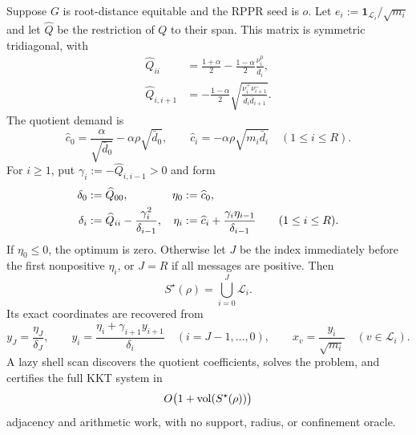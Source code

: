 \begin{theorem}
\label{thm:equitable-shell-one-pass}
Suppose $G$ is root-distance equitable and the RPPR seed is $o$.  Let
$e_i:=\mathbf 1_{\mathcal L_i}/\sqrt{m_i}$ and let $\widehat Q$ be the
restriction of $Q$ to their span.  This matrix is symmetric tridiagonal, with
\begin{align}
 \widehat Q_{ii}
 &=\frac{1+\alpha}{2}
   -\frac{1-\alpha}{2}\frac{\nu_i^0}{\bar d_i},
 \label{eq:equitable-quotient-diagonal}\\
 \widehat Q_{i,i+1}
 &=-\frac{1-\alpha}{2}
 \sqrt{\frac{\nu_i^+\nu_{i+1}^-}
 {\bar d_i\bar d_{i+1}}}.
 \label{eq:equitable-quotient-offdiagonal}
\end{align}
The quotient demand is
\begin{equation}
 \widehat c_0
 =\frac{\alpha}{\sqrt{\bar d_0}}
  -\alpha\rho\sqrt{\bar d_0},
 \qquad
 \widehat c_i=-\alpha\rho\sqrt{m_i\bar d_i}
 \quad(1\leq i\leq R).
 \label{eq:equitable-quotient-demand}
\end{equation}
For $i\geq1$, put $\gamma_i:=-\widehat Q_{i,i-1}>0$ and form
\begin{align}
 \delta_0&:=\widehat Q_{00},
 &\eta_0&:=\widehat c_0,
 \notag\\
 \delta_i&:=\widehat Q_{ii}-\frac{\gamma_i^2}{\delta_{i-1}},
 &\eta_i&:=\widehat c_i+
   \frac{\gamma_i\eta_{i-1}}{\delta_{i-1}}
 \qquad(1\leq i\leq R).
 \label{eq:equitable-forward-schur}
\end{align}
If $\eta_0\leq0$, the optimum is zero.  Otherwise let $J$ be the index
immediately before the first nonpositive $\eta_i$, or $J=R$ if all messages
are positive.  Then
\begin{equation}
 S^\star(\rho)=\bigcup_{i=0}^J\mathcal L_i.
 \label{eq:equitable-exact-support}
\end{equation}
Its exact coordinates are recovered from
\begin{equation}
 y_J=\frac{\eta_J}{\delta_J},
 \qquad
 y_i=\frac{\eta_i+\gamma_{i+1}y_{i+1}}{\delta_i}
 \quad(i=J-1,\ldots,0),
 \qquad
 x_v=\frac{y_i}{\sqrt{m_i}}
 \quad(v\in\mathcal L_i).
 \label{eq:equitable-backsolve}
\end{equation}
A lazy shell scan discovers the quotient coefficients, solves the problem,
and certifies the full KKT system in
\begin{equation}
 O\bigl(1+\operatorname{vol}(S^\star(\rho))\bigr)
 \label{eq:equitable-output-linear-work}
\end{equation}
adjacency and arithmetic work, with no support, radius, or confinement oracle.
\end{theorem}

